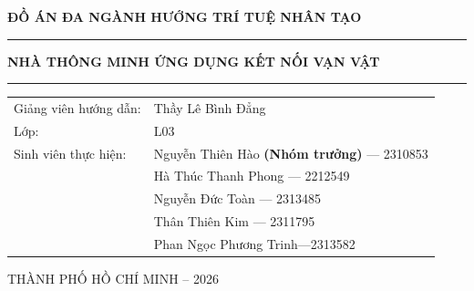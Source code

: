 \begin{titlepage}
\vspace{0.2cm}
\begin{center}
\textbf{{\LARGE ĐỒ ÁN ĐA NGÀNH HƯỚNG TRÍ TUỆ NHÂN TẠO}}\\[0.5cm]

\hrule
\vspace{1cm}
\textbf{{\huge NHÀ THÔNG MINH
ỨNG DỤNG KẾT NỐI VẠN VẬT}}\\[0.1cm]
\vspace{1cm}
\hrule

\vspace{.5cm}


\begin{table}[h]
\large
\centering

\renewcommand{\arraystretch}{1.3}

\begin{tabular}{ l l }
Giảng viên hướng dẫn: & Thầy Lê Bình Đẳng \\

Lớp: & L03 \\

Sinh viên thực hiện: & Nguyễn Thiên	Hào \textbf{(Nhóm trưởng)} --- 2310853 \\
& Hà Thúc Thanh Phong --- 2212549 \\
& Nguyễn Đức Toàn	 --- 2313485 \\
& Thân Thiên Kim --- 2311795 \\
& Phan Ngọc Phương Trinh---2313582 \\
\end{tabular}

\end{table}


\end{center}


\vspace{.6cm}
\centerline{\large THÀNH PHỐ HỒ CHÍ MINH -- 2026}

\end{titlepage}

\restoregeometry
